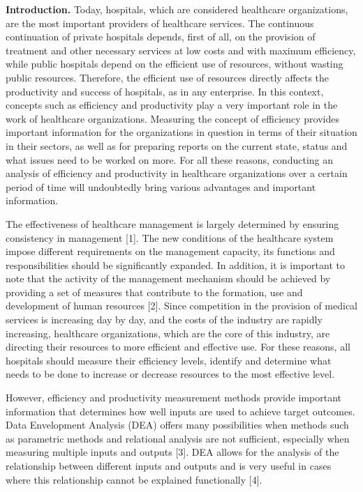 \begin{multicols}{2}
{\bfseries Introduction.} Today, hospitals, which are considered healthcare
organizations, are the most important providers of healthcare services.
The continuous continuation of private hospitals depends, first of all,
on the provision of treatment and other necessary services at low costs
and with maximum efficiency, while public hospitals depend on the
efficient use of resources, without wasting public resources. Therefore,
the efficient use of resources directly affects the productivity and
success of hospitals, as in any enterprise. In this context, concepts
such as efficiency and productivity play a very important role in the
work of healthcare organizations. Measuring the concept of efficiency
provides important information for the organizations in question in
terms of their situation in their sectors, as well as for preparing
reports on the current state, status and what issues need to be worked
on more. For all these reasons, conducting an analysis of efficiency and
productivity in healthcare organizations over a certain period of time
will undoubtedly bring various advantages and important information.

The effectiveness of healthcare management is largely determined by
ensuring consistency in management {[}1{]}. The new conditions of the
healthcare system impose different requirements on the management
capacity, its functions and responsibilities should be significantly
expanded. In addition, it is important to note that the activity of the
management mechanism should be achieved by providing a set of measures
that contribute to the formation, use and development of human resources
{[}2{]}. Since competition in the provision of medical services is
increasing day by day, and the costs of the industry are rapidly
increasing, healthcare organizations, which are the core of this
industry, are directing their resources to more efficient and effective
use. For these reasons, all hospitals should measure their efficiency
levels, identify and determine what needs to be done to increase or
decrease resources to the most effective level.

However, efficiency and productivity measurement methods provide
important information that determines how well inputs are used to
achieve target outcomes. Data Envelopment Analysis (DEA) offers many
possibilities when methods such as parametric methods and relational
analysis are not sufficient, especially when measuring multiple inputs
and outputs {[}3{]}. DEA allows for the analysis of the relationship
between different inputs and outputs and is very useful in cases where
this relationship cannot be explained functionally {[}4{]}.


\end{multicols}
